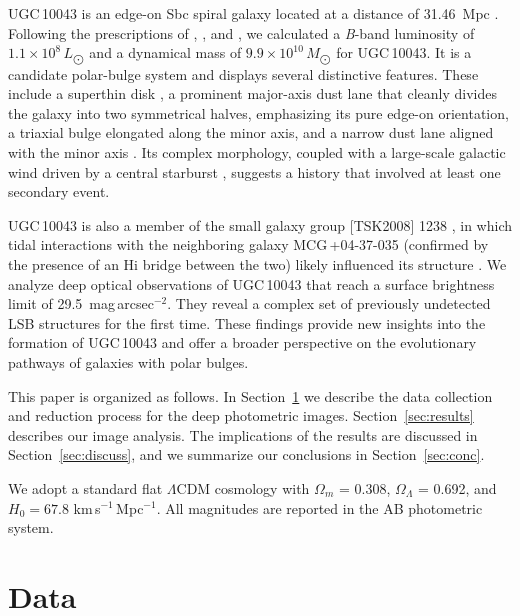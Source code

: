 \documentclass[letter]{aa}
\begin{document}
UGC\,10043 is an edge-on Sbc spiral galaxy located at a distance of 31.46~Mpc \citep{2021ApJ...914..104B}. Following the prescriptions of \citet{1998AJ....115.2264T}, \citet{2004AJ....128..137M}, and \citet{2005ApJS..160..149S}, we calculated a {\it B}-band luminosity of $1.1 \times 10^8\,L_{\bigodot}$ and a dynamical mass of $9.9 \times 10^{10}\,M_{\bigodot}$ for UGC\,10043. It is a candidate polar-bulge system \citep{2015AstL...41..748R} and displays several distinctive features. These include a superthin disk \citep{2021ApJ...914..104B}, a prominent major-axis dust lane that cleanly divides the galaxy into two symmetrical halves, emphasizing its pure edge-on orientation, a triaxial bulge elongated along the minor axis, and a narrow dust lane aligned with the minor axis \citep{2004AJ....128..137M, 2019MNRAS.488..590B}. Its complex morphology, coupled with a large-scale galactic wind driven by a central starburst \citep{aguirre09}, suggests a history that involved at least one secondary event. 

UGC\,10043 is also a member of the small galaxy group [TSK2008] 1238 \citep{2008ApJ...676..184T, 2013AJ....146...86T}, in which tidal interactions with the neighboring galaxy MCG\,+04-37-035 (confirmed by the presence of an H{\sc i} bridge between the two) likely influenced its structure \citep{aguirre09}. We analyze deep optical observations of UGC\,10043 that reach a surface brightness limit of 29.5~mag\,arcsec$^{-2}$. They reveal a complex set of previously undetected LSB structures for the first time. These findings provide new insights into the formation of UGC\,10043 and offer a broader perspective on the evolutionary pathways of galaxies with polar bulges.

This paper is organized as follows. In Section~\ref{sec:data} we describe the data collection and reduction process for the deep photometric images. Section~\ref{sec:results} describes our image analysis. The implications of the results are discussed in Section~\ref{sec:discuss}, and we summarize our conclusions in Section~\ref{sec:conc}.

We adopt a standard flat $\Lambda$CDM cosmology with $\Omega_{m}$ = 0.308, $\Omega_{\Lambda}$ = 0.692, and $H_0=67.8$ km\,s$^{-1}$\,Mpc$^{-1}$. All magnitudes are reported in the AB photometric system.


\section{Data} \label{sec:data}
\end{document}
